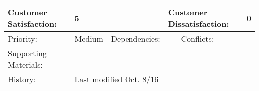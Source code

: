 \documentclass[11pt]{article}
\begin{document}
\begin{tabular}{|l|l|l|l|l|l|}
Customer Satisfaction:          & \multicolumn{2}{l|}{5}                                              & \multicolumn{2}{l|}{Customer Dissatisfaction:}               & 0                       \\ \hline
Priority:                       & Medium                      & Dependencies:                         &                        & Conflicts:                          &                         \\ \hline
Supporting Materials:           & \multicolumn{5}{l|}{}                                                                                                                                        \\ \hline
History:                        & \multicolumn{5}{l|}{Last modified Oct. 8/16}                                                                                                                 \\ \hline
\end{tabular}



\vspace{10 mm}
\end{document}
